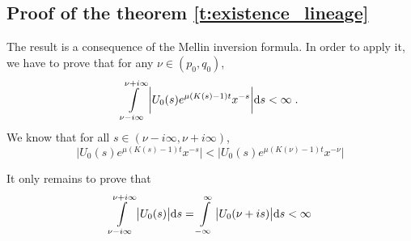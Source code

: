 \documentclass[11pt]{amsart}
\begin{document}
\subsection{Proof of the theorem \ref{t:existence_lineage}}
\label{proof:existence_lineage}
The result is a consequence of the Mellin inversion formula.
In order to apply it, we have to prove that for any $\nu \in (p_0, q_0)$, 
    \begin{equation*}
        \int\limits_{\nu - i \infty}^{\nu + i \infty} \bigg| U_0(s) e^{\mu(K(s) - 1) t} x^{-s} \bigg| \mathrm ds < \infty
        \; .
    \end{equation*}
We know that for all $s \in (\nu - i\infty, \nu + i\infty)$, 
    \begin{equation*}
         \bigg| U_0(s) e^{\mu(K(s) - 1) t} x^{-s} \bigg|  <   \bigg| U_0(s)  e^{\mu(K(\nu) - 1) t}  x^{-\nu} \bigg|
    \end{equation*}

It only remains to prove that 
    \begin{equation}
            \int\limits_{\nu - i \infty}^{\nu + i \infty} \big| U_0(s)\big| \mathrm ds 
            = 
            \int\limits_{-\infty}^{\infty} \big| U_0(\nu + is)\big| \mathrm ds
            < \infty
            \label{eq:DouEsc43}
    \end{equation}
\end{document}
